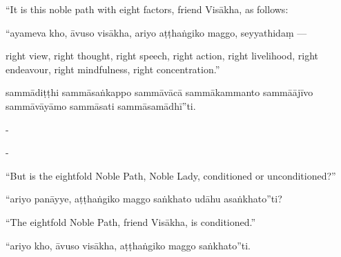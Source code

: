 \begin{samepage}
\begin{leftcolumn*}
“It is this noble path with eight factors, friend Visākha, as follows:
\end{leftcolumn*}

\begin{rightcolumn}
“ayameva kho, āvuso visākha, ariyo aṭṭhaṅgiko maggo, seyyathidaṃ —
\end{rightcolumn}
\end{samepage}

\begin{samepage}
\begin{leftcolumn*}
right view, right thought, right speech, right action, right livelihood, right endeavour, right mindfulness, right concentration.”
\end{leftcolumn*}

\begin{rightcolumn}
sammādiṭṭhi sammāsaṅkappo sammāvācā sammākammanto sammāājīvo sammāvāyāmo sammāsati sammāsamādhī”ti.
\end{rightcolumn}
\end{samepage}

\begin{samepage}
\begin{leftcolumn*}
-
\end{leftcolumn*}

\begin{rightcolumn}
-
\end{rightcolumn}
\end{samepage}

\begin{samepage}
\begin{leftcolumn*}
“But is the eightfold Noble Path, Noble Lady, conditioned or unconditioned?”
\end{leftcolumn*}

\begin{rightcolumn}
“ariyo panāyye, aṭṭhaṅgiko maggo saṅkhato udāhu asaṅkhato”ti?
\end{rightcolumn}
\end{samepage}

\begin{samepage}
\begin{leftcolumn*}
“The eightfold Noble Path, friend Visākha, is conditioned.”
\end{leftcolumn*}

\begin{rightcolumn}
“ariyo kho, āvuso visākha, aṭṭhaṅgiko maggo saṅkhato”ti.
\end{rightcolumn}
\end{samepage}

